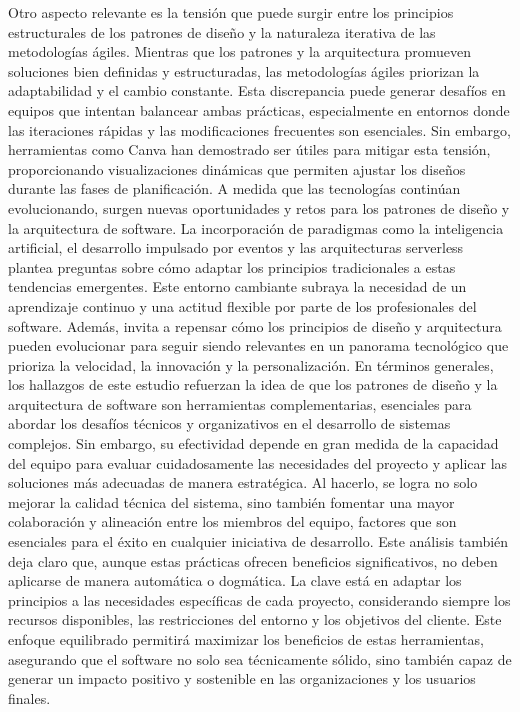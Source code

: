 \documentclass[conference]{IEEEtran}
\begin{document}
Otro aspecto relevante es la tensión que puede surgir entre los principios estructurales de los patrones de diseño y la naturaleza iterativa de las metodologías ágiles. Mientras que los patrones y la arquitectura promueven soluciones bien definidas y estructuradas, las metodologías ágiles priorizan la adaptabilidad y el cambio constante. Esta discrepancia puede generar desafíos en equipos que intentan balancear ambas prácticas, especialmente en entornos donde las iteraciones rápidas y las modificaciones frecuentes son esenciales. Sin embargo, herramientas como Canva han demostrado ser útiles para mitigar esta tensión, proporcionando visualizaciones dinámicas que permiten ajustar los diseños durante las fases de planificación.
A medida que las tecnologías continúan evolucionando, surgen nuevas oportunidades y retos para los patrones de diseño y la arquitectura de software. La incorporación de paradigmas como la inteligencia artificial, el desarrollo impulsado por eventos y las arquitecturas serverless plantea preguntas sobre cómo adaptar los principios tradicionales a estas tendencias emergentes. Este entorno cambiante subraya la necesidad de un aprendizaje continuo y una actitud flexible por parte de los profesionales del software. Además, invita a repensar cómo los principios de diseño y arquitectura pueden evolucionar para seguir siendo relevantes en un panorama tecnológico que prioriza la velocidad, la innovación y la personalización.
En términos generales, los hallazgos de este estudio refuerzan la idea de que los patrones de diseño y la arquitectura de software son herramientas complementarias, esenciales para abordar los desafíos técnicos y organizativos en el desarrollo de sistemas complejos. Sin embargo, su efectividad depende en gran medida de la capacidad del equipo para evaluar cuidadosamente las necesidades del proyecto y aplicar las soluciones más adecuadas de manera estratégica. Al hacerlo, se logra no solo mejorar la calidad técnica del sistema, sino también fomentar una mayor colaboración y alineación entre los miembros del equipo, factores que son esenciales para el éxito en cualquier iniciativa de desarrollo.
Este análisis también deja claro que, aunque estas prácticas ofrecen beneficios significativos, no deben aplicarse de manera automática o dogmática. La clave está en adaptar los principios a las necesidades específicas de cada proyecto, considerando siempre los recursos disponibles, las restricciones del entorno y los objetivos del cliente. Este enfoque equilibrado permitirá maximizar los beneficios de estas herramientas, asegurando que el software no solo sea técnicamente sólido, sino también capaz de generar un impacto positivo y sostenible en las organizaciones y los usuarios finales.
\end{document}
